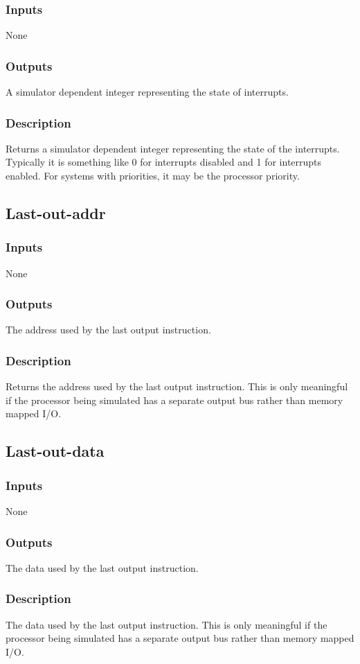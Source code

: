 \documentclass[10pt, openany]{book}
\begin{document}
\subsubsection{Inputs}
None
\subsubsection{Outputs}
A simulator dependent integer representing the state of interrupts.
\subsubsection{Description}
Returns a simulator dependent integer representing the state of the interrupts.  Typically it is something like 0 for interrupts disabled and 1 for interrupts enabled.  For systems with priorities, it may be the processor priority.

\subsection{Last-out-addr}
\subsubsection{Inputs}
None
\subsubsection{Outputs}
The address used by the last output instruction.
\subsubsection{Description}
Returns the address used by the last output instruction.  This is only meaningful if the processor being simulated has a separate output bus rather than memory mapped I/O.

\subsection{Last-out-data}
\subsubsection{Inputs}
None
\subsubsection{Outputs}
The data used by the last output instruction.
\subsubsection{Description}
The data used by the last output instruction.  This is only meaningful if the processor being simulated has a separate output bus rather than memory mapped I/O.
\end{document}
